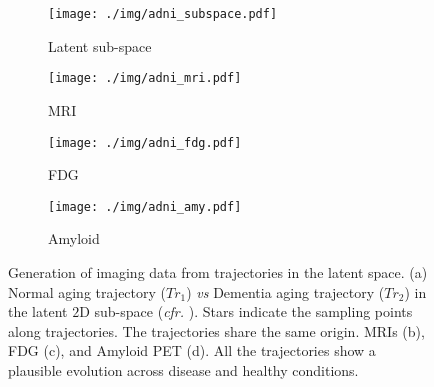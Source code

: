 \begin{figure*}[htb]
\centering
\hfill
\begin{subfigure}{0.3\columnwidth}
        \texttt{[image: ./img/adni\_subspace.pdf]}
        \caption{Latent sub-space}
\end{subfigure}
\hfill
\begin{subfigure}{0.5\columnwidth}
        \texttt{[image: ./img/adni\_mri.pdf]}
        \caption{MRI}
\end{subfigure}
\hfill
\begin{subfigure}{0.5\columnwidth}
        \texttt{[image: ./img/adni\_fdg.pdf]}
        \caption{FDG}
\end{subfigure}
\hfill
\begin{subfigure}{0.5\columnwidth}
        \texttt{[image: ./img/adni\_amy.pdf]}
        \caption{Amyloid}
\end{subfigure}
\hfill
\caption{
Generation of imaging data from trajectories in the latent space.
(a) Normal aging trajectory ($Tr_1$) \textit{vs} Dementia aging trajectory ($Tr_2$) in the latent $2$D sub-space (\textit{cfr.} ).
Stars indicate the sampling points along trajectories.
The trajectories share the same origin.
MRIs (b), FDG (c), and Amyloid PET (d).
All the trajectories show a plausible evolution across disease and healthy conditions.
}
\label{fig:ageing}
\end{figure*}
